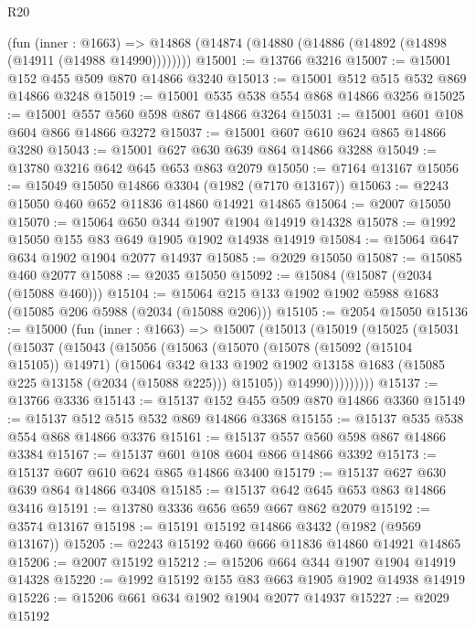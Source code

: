\begin{lexlean}{R20}
\begin{coremodule}
    (fun (inner : @1663) =>
    @14868 (@14874 (@14880 (@14886 (@14892 (@14898 (@14911 (@14988 @14990))))))))
@15001 := @13766 @3216
@15007 := @15001 @152 @455 @509 @870 @14866 @3240
@15013 := @15001 @512 @515 @532 @869 @14866 @3248
@15019 := @15001 @535 @538 @554 @868 @14866 @3256
@15025 := @15001 @557 @560 @598 @867 @14866 @3264
@15031 := @15001 @601 @108 @604 @866 @14866 @3272
@15037 := @15001 @607 @610 @624 @865 @14866 @3280
@15043 := @15001 @627 @630 @639 @864 @14866 @3288
@15049 := @13780 @3216 @642 @645 @653 @863 @2079
@15050 := @7164 @13167
@15056 := @15049 @15050 @14866 @3304 (@1982 (@7170 @13167))
@15063 := @2243 @15050 @460 @652 @11836 @14860 @14921 @14865
@15064 := @2007 @15050
@15070 := @15064 @650 @344 @1907 @1904 @14919 @14328
@15078 := @1992 @15050 @155 @83 @649 @1905 @1902 @14938 @14919
@15084 := @15064 @647 @634 @1902 @1904 @2077 @14937
@15085 := @2029 @15050
@15087 := @15085 @460 @2077
@15088 := @2035 @15050
@15092 := @15084 (@15087 (@2034 (@15088 @460)))
@15104 := @15064 @215 @133 @1902 @1902 @5988 @1683 (@15085 @206 @5988 (@2034 (@15088 @206)))
@15105 := @2054 @15050
@15136 := @15000
    (fun (inner : @1663) =>
    @15007
      (@15013
        (@15019
          (@15025
            (@15031
              (@15037
                (@15043
                  (@15056
                    (@15063
                      (@15070
                        (@15078 (@15092 (@15104 @15105)) @14971)
                        (@15064
                          @342
                          @133
                          @1902
                          @1902
                          @13158
                          @1683
                          (@15085 @225 @13158 (@2034 (@15088 @225)))
                          @15105))
                      @14990)))))))))
@15137 := @13766 @3336
@15143 := @15137 @152 @455 @509 @870 @14866 @3360
@15149 := @15137 @512 @515 @532 @869 @14866 @3368
@15155 := @15137 @535 @538 @554 @868 @14866 @3376
@15161 := @15137 @557 @560 @598 @867 @14866 @3384
@15167 := @15137 @601 @108 @604 @866 @14866 @3392
@15173 := @15137 @607 @610 @624 @865 @14866 @3400
@15179 := @15137 @627 @630 @639 @864 @14866 @3408
@15185 := @15137 @642 @645 @653 @863 @14866 @3416
@15191 := @13780 @3336 @656 @659 @667 @862 @2079
@15192 := @3574 @13167
@15198 := @15191 @15192 @14866 @3432 (@1982 (@9569 @13167))
@15205 := @2243 @15192 @460 @666 @11836 @14860 @14921 @14865
@15206 := @2007 @15192
@15212 := @15206 @664 @344 @1907 @1904 @14919 @14328
@15220 := @1992 @15192 @155 @83 @663 @1905 @1902 @14938 @14919
@15226 := @15206 @661 @634 @1902 @1904 @2077 @14937
@15227 := @2029 @15192

\end{coremodule}
\end{lexlean}
